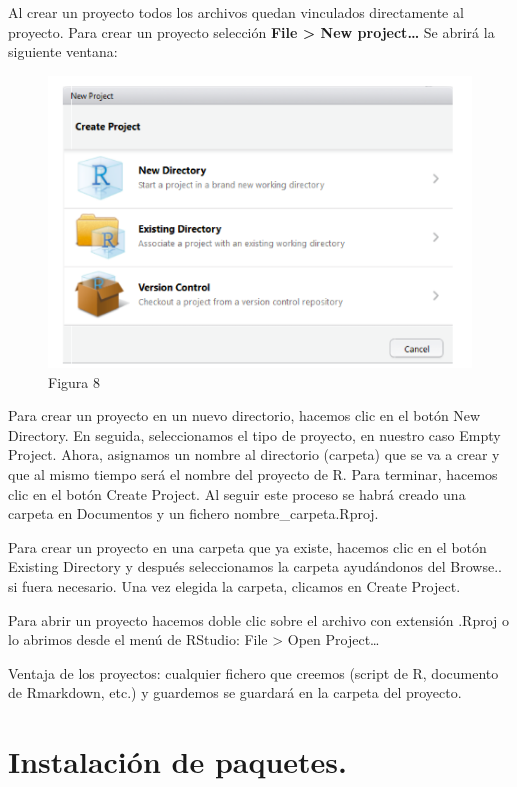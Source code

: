 \documentclass[
]{book}
\begin{document}
Al crear un proyecto todos los archivos quedan vinculados directamente al proyecto. Para crear un proyecto selección \textbf{File \textgreater{} New project\ldots{}} Se abrirá la siguiente ventana:

\begin{figure}
\centering
\includegraphics{imagenes/09.png}
\caption{Figura 8}
\end{figure}

Para crear un proyecto en un nuevo directorio, hacemos clic en el botón New Directory. En seguida, seleccionamos el tipo de proyecto, en nuestro caso Empty Project. Ahora, asignamos un nombre al directorio (carpeta) que se va a crear y que al mismo tiempo será el nombre del proyecto de R. Para terminar, hacemos clic en el botón Create Project. Al seguir este proceso se habrá creado una carpeta en Documentos y un fichero nombre\_carpeta.Rproj.

Para crear un proyecto en una carpeta que ya existe, hacemos clic en el botón Existing Directory y después seleccionamos la carpeta ayudándonos del Browse.. si fuera necesario. Una vez elegida la carpeta, clicamos en Create Project.

Para abrir un proyecto hacemos doble clic sobre el archivo con extensión .Rproj o lo abrimos desde el menú de RStudio: File \textgreater{} Open Project\ldots{}

Ventaja de los proyectos: cualquier fichero que creemos (script de R, documento de Rmarkdown, etc.) y guardemos se guardará en la carpeta del proyecto.

\hypertarget{instalaciuxf3n-de-paquetes.}{%
\section{Instalación de paquetes.}\label{instalaciuxf3n-de-paquetes.}}
\end{document}
